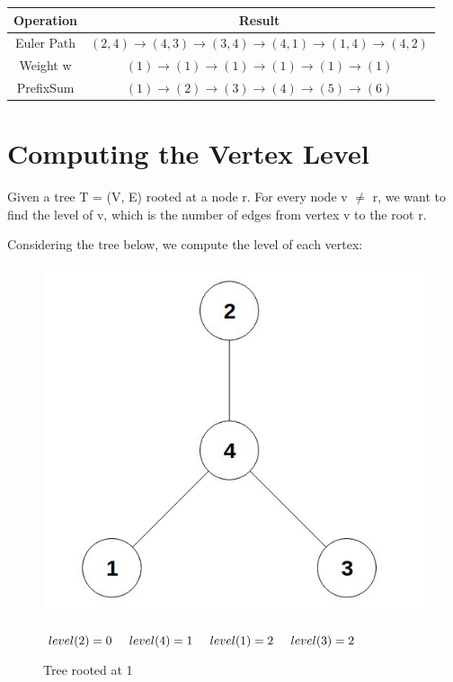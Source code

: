 \documentclass[twoside]{article}
\begin{document}
\begin{center}
 \begin{tabular}{||c c||} 
 \hline
    Operation & Result \\
 \hline
 	Euler Path & $(2,4)\to(4,3)\to(3,4)\to(4,1)\to(1,4)\to(4,2)$ \\ 
 \hline
 	Weight w & $(1)\to(1)\to(1)\to(1)\to(1)\to(1)$ \\
 \hline
 	PrefixSum & $(1)\to(2)\to(3)\to(4)\to(5)\to(6)$ \\
 \hline
\end{tabular}
\end{center}

\section{Computing the Vertex Level}
Given a tree T = (V, E) rooted at a node r. For every node v $\neq$ r, we want to find the level of v, which is the number of edges from vertex v to the root r.

Considering the tree below, we compute the level of each vertex:

\begin{figure}[!h]
\centering
\begin{minipage}{.5\textwidth}
  \centering
  \includegraphics[scale=.25]{g2}
  \caption{Tree rooted at 1} 
  $level(2) = 0\hspace{0.5cm}level(4) = 1\hspace{0.5cm}level(1) = 2 \hspace{0.5cm}level(3) = 2$
  \label{fig:test1}
\end{minipage}%
\end{figure}
\end{document}
